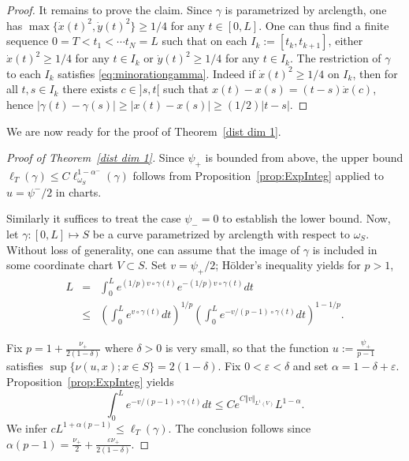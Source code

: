 \documentclass[a4paper,11pt,leqno,english]{smfart}
\theoremstyle{plain}
\theoremstyle{plain}
\numberwithin{equation}{section} %
\numberwithin{figure}{section} %
\theoremstyle{plain}
\theoremstyle{plain}
\theoremstyle{remark}
\theoremstyle{remark}
\theoremstyle{definition}
\theoremstyle{plain}
\theoremstyle{plain}
\theoremstyle{definition}
\newcommand{\e}{\varepsilon}
\newcommand{\p}{\psi}
\begin{document}
\begin{proof}
    
   
   It remains to prove the claim. Since $\gamma$ is parametrized by arclength,
   one has $\max \{\dot x (t)^2, \dot y (t)^2\} \geq  1/4$ for any $t \in [0,L]$.
One can thus find a finite sequence  $0 = T < t_1 < \cdots t_N = L$ such that  on each  
  $I_k := [t_k,t_{k+1}]$, either $ \dot x (t)^2  \geq 1\slash 4$ for any $t \in I_k$ 
  or $ \dot y (t)^2  \geq 1\slash 4$ for any $t \in I_k$.  
 The restriction of $\gamma$ to each   $I_k$ satisfies \eqref{eq:minorationgamma}.  
Indeed if $ \dot x (t)^2  \geq 1\slash 4$ on $I_k$,
then for all $t, s \in I_k$ there exists $c \in ]s,t[$ such that $x(t) - x(s) = (t-s) \dot x (c)$,
hence $\vert \gamma(t) - \gamma (s) \vert \geq \vert x(t) - x(s)\vert \geq  (1\slash 2)  \vert t-s \vert$.
 \end{proof}
    
    
    We are now ready for the proof of Theorem~\ref{dist dim 1}. 
    
    \begin{proof}[Proof of Theorem~\ref{dist dim 1}]
  Since $\p_+$ is bounded from above,  the upper bound 
  $\ell_{T}(\gamma) \leq C \ell_{\omega_S}^{1-\alpha^-}(\gamma)$ follows from Proposition~\ref{prop:ExpInteg} applied 
  to $u=\p^-/2$ in charts. 
  
  Similarly it suffices to treat the case $\p_-=0$ to establish the lower bound.
  Now, let $\gamma:[0,L] \mapsto S$ be a curve parametrized by arclength with respect to $\omega_S$. Without loss of generality, one can assume that the image of $\gamma$ is included in some coordinate chart $V\subset S$. 
Set $v=\p_+/2$; H\"older's inequality yields for  $p > 1$,
 \begin{eqnarray*}
  L &=&  \int_0^L e^{(1\slash p) v \circ \gamma(t)}  e^{- (1\slash p) v \circ \gamma(t)} d t \\
  &\leq & \left(\int_0^L e^{v \circ \gamma(t)} d t \right)^{1/p} \left(\int_0^L e^{- v \slash (p-1) \circ \gamma(t)} d t \right)^{1-1/p}.
 \end{eqnarray*}
 
Fix $p = 1 + \frac{\nu_+}{2(1-\delta)}$ where $\delta>0$ is very small, so that the function $u := \frac{\p_+}{p-1}$
satisfies $\sup \{\nu(u,x) ; x \in S \} =2(1-\delta)$.
Fix $0<\e<\delta$ and set  $\alpha=1-\delta+\e$.
Proposition~\ref{prop:ExpInteg}  yields
  $$
  \int_0^L e^{- v \slash (p-1) \circ \gamma(t)} d t \leq  C  e^{ C \Vert v \Vert_{L^1(V)}}L^{1 - \alpha}.
  $$
We infer  $c L^{1 + \alpha(p-1)} \leq  \ell_{T}(\gamma)$.
The conclusion follows since $\alpha(p-1)=\frac{\nu_+}{2}+\frac{\e \nu_+}{2(1-\delta)}$.
    \end{proof}
\end{document}
